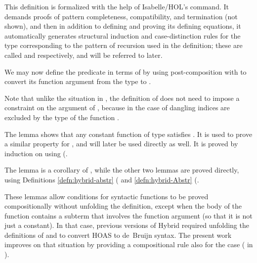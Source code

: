 \documentclass[copyright,creativecommons]{eptcs}
\begin{document}
This definition is formalized with the help of Isabelle\slash HOL's
 command.  It demands proofs of pattern completeness,
compatibility, and termination (not shown), and then in addition to
defining  and proving its defining equations, it automatically
generates structural induction and case-distinction rules for the type
 corresponding to the pattern of recursion used
in the definition; these are called  and
 respectively, and will be referred to
later.

We may now define the predicate  in terms of  by
using post-\break composition with  to convert its function argument
from the type  to .

\begin{Defn}
\label{defn:hybrid-abstr} \formal
\par\nopagebreak

\end{Defn}

Note that unlike the situation in \cite{ambler/crole/momigliano:2002},
the definition of  does not need to impose a constraint on the
argument of , because in the case of  dangling
indices are excluded by the type of the function .

\begin{Lem}
\label{lem:hybrid-Abstr-const} \formal

\end{Lem}


The lemma  shows that any constant function of type
 satisfies .  It is used to prove a similar
property for , and will later be used directly as well.
It is proved by induction on  using 
(.

\begin{Lem}
\label{lem:hybrid-abstr-simps-part1} \formal \par\nopagebreak[3]
\par\nopagebreak[3]

\end{Lem}


The lemma  is a corollary of ,
while the other two lemmas are proved directly, using
Definitions \ref{defn:hybrid-abstr} (
and \ref{defn:hybrid-Abstr} (.

These lemmas allow  conditions for syntactic functions to be
proved compositionally without unfolding the definition, except when
the body of the function contains a  subterm that involves the
function argument (so that it is not just a constant).  In that case,
previous versions of Hybrid required unfolding the definitions of 
and  to convert HOAS to de~Bruijn syntax.  The present work improves
on that situation by providing a compositional rule also for the 
case ( in
).
\end{document}

